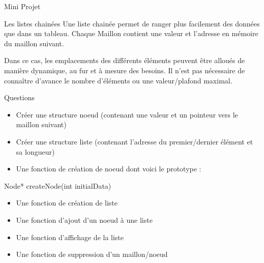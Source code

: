 \documentclass[
  10pt,
  french,
  ignorenonframetext,
  aspectratio=169,
]{beamer}
\newenvironment{Shaded}{}{}
\newcommand{\DataTypeTok}[1]{\textcolor[rgb]{0.56,0.13,0.00}{#1}}
\newcommand{\NormalTok}[1]{#1}
\newcommand{\OperatorTok}[1]{\textcolor[rgb]{0.40,0.40,0.40}{#1}}
\providecommand{\tightlist}{%
  \setlength{\itemsep}{0pt}\setlength{\parskip}{0pt}}
\begin{document}
\begin{frame}[fragile]{Mini Projet}
\protect\hypertarget{mini-projet}{}
\begin{block}{Les listes chainées}
\protect\hypertarget{les-listes-chainuxe9es}{}
Une liste chainée permet de ranger plus facilement des données que dans
un tableau. Chaque Maillon contient une valeur et l'adresse en mémoire
du maillon suivant.

Dans ce cas, les emplacements des différents éléments peuvent être
alloués de manière dynamique, au fur et à mesure des besoins. Il n'est
pas nécessaire de connaître d'avance le nombre d'éléments ou une
valeur/plafond maximal.

\begin{block}{Questions}
\protect\hypertarget{questions}{}
\begin{itemize}
\tightlist
\item
  Créer une structure noeud (contenant une valeur et un pointeur vers le
  maillon suivant)
\item
  Créer une structure liste (contenant l'adresse du premier/dernier
  élément et sa longueur)
\item
  Une fonction de création de noeud dont voici le prototype :
\end{itemize}

\begin{Shaded}
\begin{Highlighting}[]
\NormalTok{Node}\OperatorTok{*}\NormalTok{ createNode}\OperatorTok{(}\DataTypeTok{int}\NormalTok{ initialData}\OperatorTok{)}
\end{Highlighting}
\end{Shaded}

\begin{itemize}
\tightlist
\item
  Une fonction de création de liste
\item
  Une fonction d'ajout d'un noeud à une liste
\item
  Une fonction d'affichage de la liste
\item
  Une fonction de suppression d'un maillon/noeud
\end{itemize}
\end{block}
\end{block}
\end{frame}
\end{document}
